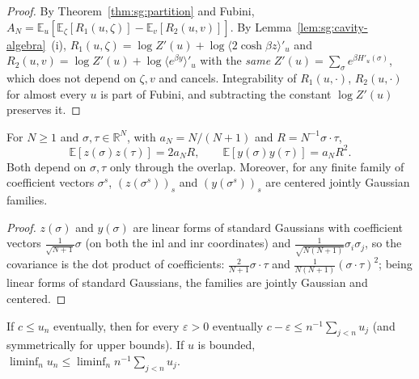 \begin{proof}
  \leanok
By Theorem~\ref{thm:sg:partition} and Fubini, $A_N=\mathbb E_u[\mathbb E_\zeta[R_1(u,\zeta)]-\mathbb E_v[R_2(u,v)]]$. By Lemma~\ref{lem:sg:cavity-algebra}~(i),
$R_1(u,\zeta)=\log Z'(u)+\log\langle2\cosh\beta z\rangle'_u$ and $R_2(u,v)=\log Z'(u)+\log\langle e^{\beta y}\rangle'_u$ with the \emph{same}
$Z'(u)=\sum_\sigma e^{\beta H'_u(\sigma)}$, which does not depend on $\zeta,v$ and cancels. Integrability of $R_1(u,\cdot)$, $R_2(u,\cdot)$ for almost
every $u$ is part of Fubini, and subtracting the constant $\log Z'(u)$ preserves it.
\end{proof}

\begin{theorem}\label{thm:sg:cavity-cov}
  \leanok
For $N\ge1$ and $\sigma,\tau\in\mathbb R^N$, with $a_N=N/(N+1)$ and $R=N^{-1}\sigma\cdot\tau$,
\[\mathbb E[z(\sigma)z(\tau)]=2a_NR,\qquad\mathbb E[y(\sigma)y(\tau)]=a_NR^2.\]
Both depend on $\sigma,\tau$ only through the overlap. Moreover, for any finite family of coefficient vectors $\sigma^s$, $(z(\sigma^s))_s$ and
$(y(\sigma^s))_s$ are centered jointly Gaussian families.
\end{theorem}

\begin{proof}
  \leanok
$z(\sigma)$ and $y(\sigma)$ are linear forms of standard Gaussians with coefficient vectors $\frac1{\sqrt{N+1}}\sigma$ (on both the $\mathrm{inl}$ and $\mathrm{inr}$
coordinates) and $\frac1{\sqrt{N(N+1)}}\sigma_i\sigma_j$, so the covariance is the dot product of coefficients:
$\frac2{N+1}\sigma\cdot\tau$ and $\frac1{N(N+1)}(\sigma\cdot\tau)^2$; being linear forms of standard Gaussians, the families are jointly
Gaussian and centered.
\end{proof}

\begin{lemma}\label{lem:sg:cesaro}
  \leanok
If $c\le u_n$ eventually, then for every $\varepsilon>0$ eventually $c-\varepsilon\le n^{-1}\sum_{j<n}u_j$ (and symmetrically for upper bounds). If $u$ is bounded,
$\liminf_nu_n\le\liminf_nn^{-1}\sum_{j<n}u_j$.
\end{lemma}

